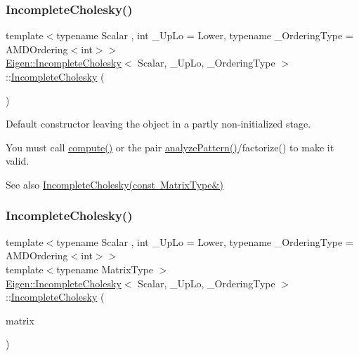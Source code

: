 \subsubsection{\texorpdfstring{IncompleteCholesky()}{IncompleteCholesky()}\hspace{0.1cm}{\footnotesize\ttfamily [1/2]}}
{\footnotesize\ttfamily template$<$typename Scalar , int \+\_\+\+Up\+Lo = Lower, typename \+\_\+\+Ordering\+Type  = A\+M\+D\+Ordering$<$int$>$$>$ \\
\mbox{\hyperlink{class_eigen_1_1_incomplete_cholesky}{Eigen\+::\+Incomplete\+Cholesky}}$<$ Scalar, \+\_\+\+Up\+Lo, \+\_\+\+Ordering\+Type $>$\+::\mbox{\hyperlink{class_eigen_1_1_incomplete_cholesky}{Incomplete\+Cholesky}} (\begin{DoxyParamCaption}{ }\end{DoxyParamCaption})\hspace{0.3cm}{\ttfamily [inline]}}

Default constructor leaving the object in a partly non-\/initialized stage.

You must call \mbox{\hyperlink{class_eigen_1_1_incomplete_cholesky_a7966bedeebbeaa7a8fe4dd1da3797a0b}{compute()}} or the pair \mbox{\hyperlink{class_eigen_1_1_incomplete_cholesky_a702560ecdddef77dc51d20ab22bd974e}{analyze\+Pattern()}}/factorize() to make it valid.

\begin{DoxySeeAlso}{See also}
\mbox{\hyperlink{class_eigen_1_1_incomplete_cholesky_a757499fc814988a5b112b1f34d0295e1}{Incomplete\+Cholesky(const Matrix\+Type\&)}} 
\end{DoxySeeAlso}
\mbox{\label{class_eigen_1_1_incomplete_cholesky_a757499fc814988a5b112b1f34d0295e1}} 
\subsubsection{\texorpdfstring{IncompleteCholesky()}{IncompleteCholesky()}\hspace{0.1cm}{\footnotesize\ttfamily [2/2]}}
{\footnotesize\ttfamily template$<$typename Scalar , int \+\_\+\+Up\+Lo = Lower, typename \+\_\+\+Ordering\+Type  = A\+M\+D\+Ordering$<$int$>$$>$ \\
template$<$typename Matrix\+Type $>$ \\
\mbox{\hyperlink{class_eigen_1_1_incomplete_cholesky}{Eigen\+::\+Incomplete\+Cholesky}}$<$ Scalar, \+\_\+\+Up\+Lo, \+\_\+\+Ordering\+Type $>$\+::\mbox{\hyperlink{class_eigen_1_1_incomplete_cholesky}{Incomplete\+Cholesky}} (\begin{DoxyParamCaption}\item[{const Matrix\+Type \&}]{matrix }\end{DoxyParamCaption})\hspace{0.3cm}{\ttfamily [inline]}}

